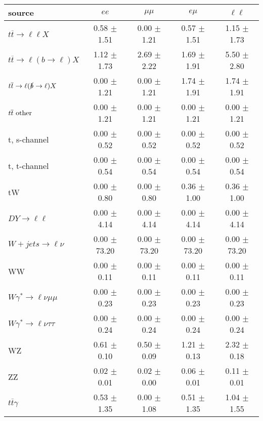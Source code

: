 \begin{tabular}{l|cccc} \hline\hline
source & $ee$ & $\mu\mu$ & $e\mu$ & $\ell\ell $ \\
\hline
$t\overline{t} \rightarrow \ell \ell X$ &  0.58 $\pm$  1.51 &  0.00 $\pm$  1.21 &  0.57 $\pm$  1.51 &  1.15 $\pm$  1.73 \\
$t\overline{t} \rightarrow \ell (b \rightarrow \ell) X$ &  1.12 $\pm$  1.73 &  2.69 $\pm$  2.22 &  1.69 $\pm$  1.91 &  5.50 $\pm$  2.80 \\
$t\overline{t} \rightarrow \ell (\slashed b \rightarrow \ell) X$ &  0.00 $\pm$  1.21 &  0.00 $\pm$  1.21 &  1.74 $\pm$  1.91 &  1.74 $\pm$  1.91 \\
        $t\overline{t}\ \rm{other}$ &  0.00 $\pm$  1.21 &  0.00 $\pm$  1.21 &  0.00 $\pm$  1.21 &  0.00 $\pm$  1.21 \\
\hline
                       t, s-channel &  0.00 $\pm$  0.52 &  0.00 $\pm$  0.52 &  0.00 $\pm$  0.52 &  0.00 $\pm$  0.52 \\
                       t, t-channel &  0.00 $\pm$  0.54 &  0.00 $\pm$  0.54 &  0.00 $\pm$  0.54 &  0.00 $\pm$  0.54 \\
                                 tW &  0.00 $\pm$  0.80 &  0.00 $\pm$  0.80 &  0.36 $\pm$  1.00 &  0.36 $\pm$  1.00 \\
\hline
         $DY \rightarrow \ell \ell$ &  0.00 $\pm$  4.14 &  0.00 $\pm$  4.14 &  0.00 $\pm$  4.14 &  0.00 $\pm$  4.14 \\
      $W+jets \rightarrow \ell \nu$ &  0.00 $\pm$ 73.20 &  0.00 $\pm$ 73.20 &  0.00 $\pm$ 73.20 &  0.00 $\pm$ 73.20 \\
                                 WW &  0.00 $\pm$  0.11 &  0.00 $\pm$  0.11 &  0.00 $\pm$  0.11 &  0.00 $\pm$  0.11 \\
\hline
$W\gamma^{*} \rightarrow \ell \nu \mu\mu$ &  0.00 $\pm$  0.23 &  0.00 $\pm$  0.23 &  0.00 $\pm$  0.23 &  0.00 $\pm$  0.23 \\
$W\gamma^{*} \rightarrow \ell \nu \tau\tau$ &  0.00 $\pm$  0.24 &  0.00 $\pm$  0.24 &  0.00 $\pm$  0.24 &  0.00 $\pm$  0.24 \\
                                 WZ &  0.61 $\pm$  0.10 &  0.50 $\pm$  0.09 &  1.21 $\pm$  0.13 &  2.32 $\pm$  0.18 \\
                                 ZZ &  0.02 $\pm$  0.01 &  0.02 $\pm$  0.00 &  0.06 $\pm$  0.01 &  0.11 $\pm$  0.01 \\
\hline
              $t\overline{t}\gamma$ &  0.53 $\pm$  1.35 &  0.00 $\pm$  1.08 &  0.51 $\pm$  1.35 &  1.04 $\pm$  1.55 \\

\end{tabular}
